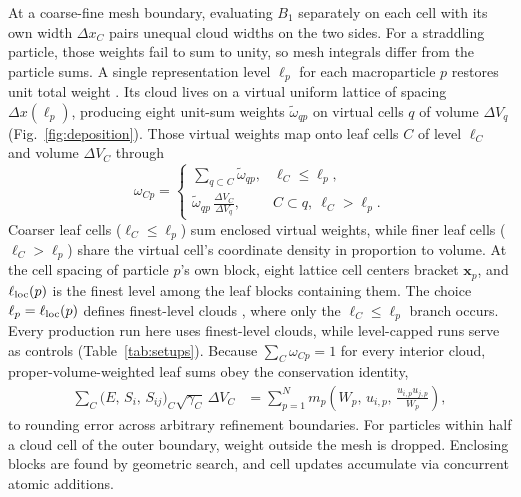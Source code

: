 At a coarse-fine mesh boundary, evaluating $B_1$ separately on each cell with its own width $\Delta x_C$ pairs unequal cloud widths on the two sides. For a straddling particle, those weights fail to sum to unity, so mesh integrals differ from the particle sums. A single representation level $\ell_p$ for each macroparticle $p$ restores unit total weight \cite{Myers:2021gfn,Wu:2026nrpic}. Its cloud lives on a virtual uniform lattice of spacing $\Delta x(\ell_p)$, producing eight unit-sum weights $\tilde{\omega}_{qp}$ on virtual cells $q$ of volume $\Delta V_q$ (Fig.~\ref{fig:deposition}). Those virtual weights map onto leaf cells $C$ of level $\ell_C$ and volume $\Delta V_C$ through
\begin{equation}\label{eq:leaf_weights}
\omega_{Cp} =
\begin{cases}
\displaystyle \sum_{q \subset C} \tilde{\omega}_{qp}, & \ell_C \le \ell_p, \\[10pt]
\displaystyle \tilde{\omega}_{qp}\,\frac{\Delta V_C}{\Delta V_q}, & C \subset q,\ \ell_C > \ell_p.
\end{cases}
\end{equation}
Coarser leaf cells ($\ell_C \le \ell_p$) sum enclosed virtual weights, while finer leaf cells ($\ell_C > \ell_p$) share the virtual cell's coordinate density in proportion to volume. At the cell spacing of particle $p$'s own block, eight lattice cell centers bracket $\bm{x}_p$, and $\ell_{\rm loc}(p)$ is the finest level among the leaf blocks containing them. The choice $\ell_p = \ell_{\rm loc}(p)$ defines finest-level clouds \cite{Myers:2021gfn,Wu:2026nrpic}, where only the $\ell_C \le \ell_p$ branch occurs. Every production run here uses finest-level clouds, while level-capped runs serve as controls (Table~\ref{tab:setups}). Because $\sum_C \omega_{Cp} = 1$ for every interior cloud, proper-volume-weighted leaf sums obey the conservation identity,
\begin{align}\label{eq:conservation_identity}
\sum_{C} \bigl(E,\, S_i,\, S_{ij}\bigr)_C \sqrt{\gamma_C}\,\Delta V_C
&= \sum_{p=1}^{N} m_p \left(W_p,\, u_{i,p},\, \frac{u_{i,p} u_{j,p}}{W_p}\right),
\end{align}
to rounding error across arbitrary refinement boundaries. For particles within half a cloud cell of the outer boundary, weight outside the mesh is dropped. Enclosing blocks are found by geometric search, and cell updates accumulate via concurrent atomic additions.

